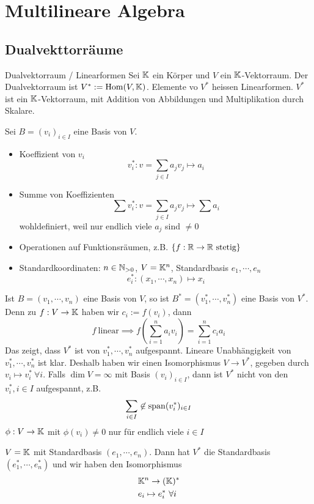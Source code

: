 \section{Multilineare Algebra}
\subsection{Dualvekttorräume}
\begin{Def}{Dualvektorraum / Linearformen}
  Sei $\mathbb{K}$ ein Körper und $V$ ein $\mathbb{K}$-Vektorraum. Der Dualvektorraum ist $V^*:=\operatorname{Hom}(V,\mathbb{K})$. Elemente vo $V^*$ heissen Linearformen. $V^*$ ist ein $\mathbb{K}$-Vektorraum, mit Addition von Abbildungen und Multiplikation durch Skalare.
\end{Def}
\begin{Eig}
  Sei $B=(v_i)_{i\in I}$ eine Basis von $V$.
  \begin{itemize}
    \item Koeffizient von $v_i$
      \[v_i^*:v=\sum_{j\in I}a_jv_j\mapsto a_i\]
    \item Summe von Koeffizienten
      \[\sum v_i^*:v=\sum_{j\in I}a_jv_j\mapsto \sum a_i\]
      wohldefiniert, weil nur endlich viele $a_j$ sind $\neq 0$
    \item Operationen auf Funktionsräumen, z.B. $\left\{ f:\mathbb{R}\to \mathbb{R}\ \text{stetig} \right\}$
    \item Standardkoordinaten: $n\in\mathbb{N}_{>0}$, $V=\mathbb{K}^n$, Standardbasis $e_1,\cdots,e_n$
      \[e_i^*:(x_1,\cdots,x_n)\mapsto x_i\]
  \end{itemize}
\end{Eig}
\begin{Bem}
  Ist $B=(v_1,\cdots,v_n)$ eine Basis von $V$, so ist $B^*=(v_1^*,\cdots,v_n^*)$ eine Basis von $V^*$. Denn zu $f:V\to \mathbb{K}$ haben wir $c_i:=f(v_i)$, dann \[f\ \text{linear} \implies f(\sum_{i=1}^na_iv_i)=\sum^n_{i=1}c_ia_i\]
  Das zeigt, dass $V^*$ ist von $v_1^*,\cdots,v_n^*$ aufgespannt. Lineare Unabhängigkeit von $v_1^*,\cdots,v_n^*$ ist klar. Deshalb haben wir einen Isomorphismus $V\to V^*$, gegeben durch $v_i\mapsto v_i^*\ \forall i$. Falls $\dim V=\infty$ mit Basis $(v_i)_{i\in I}$, dann ist $V^*$ nicht von den $v_i^*, i\in I$ aufgespannt, z.B.
  \[\sum_{i\in I}\not\in\operatorname{span}(v_i^*)_{i\in I}\]
  $\phi:V\to\mathbb{K}$ mit $\phi(v_i)\neq 0$ nur für endlich viele $i\in I$
\end{Bem}
\begin{Bsp}
  $V=\mathbb{K}$ mit Standardbasis $(e_1,\cdots,e_n)$. Dann hat $V^*$ die Standardbasis $(e_1^*,\cdots,e_n^*)$ und wir haben den Isomorphismus
  \begin{align*}
    &\mathbb{K}^n\to(\mathbb{K})^*\\
    &e_i\mapsto e^*_i\ \forall i
  \end{align*}
\end{Bsp}
